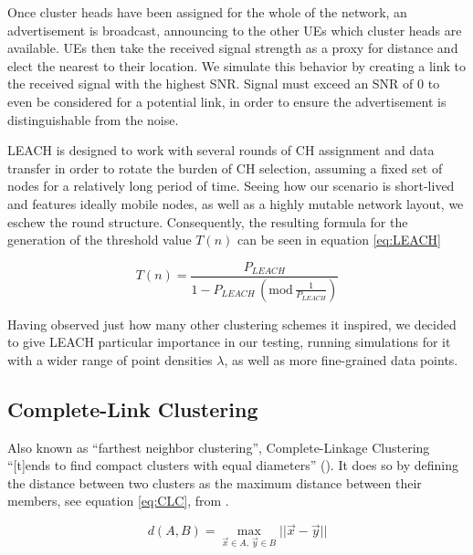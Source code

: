 Once cluster heads have been assigned for the whole of the network, an advertisement is broadcast, announcing to the other UEs which cluster heads are available. UEs then take the received signal strength as a proxy for distance and elect the nearest to their location. We simulate this behavior by creating a link to the received signal with the highest SNR. Signal must exceed an SNR of 0 to even be considered for a potential link, in order to ensure the advertisement is distinguishable from the noise. 

LEACH is designed to work with several rounds of CH assignment and data transfer in order to rotate the burden of CH selection, assuming a fixed set of nodes for a relatively long period of time. Seeing how our scenario is short-lived and features ideally mobile nodes, as well as a highly mutable network layout, we eschew the round structure. Consequently, the resulting  formula for the generation of the threshold value $T(n)$ can be seen in equation \ref{eq:LEACH}

\begin{equation}\label{eq:LEACH}
T(n) = \frac {P_{LEACH}}{1-P_{LEACH}\,(\text{mod}\,\frac {1}{P_{LEACH}})}
\end{equation}

Having observed just how many other clustering schemes it inspired, we decided to give LEACH particular importance in our testing, running simulations for it with a wider range of point densities $\lambda$, as well as more fine-grained data points.


\subsection{Complete-Link Clustering}\label{CLC}
Also known as ``farthest neighbor clustering'', Complete-Linkage Clustering ``[t]ends to find compact clusters with equal diameters'' (\cite{Everitt2011}). It does so by defining the distance between two clusters as the maximum distance between their members, see equation \ref{eq:CLC}, from \cite{Shalizi2009}. 

\begin{equation}\label{eq:CLC}
d(A,B) = \max_{\vec{x} \in A,\,\vec{y} \in B} ||\vec{x}  - \vec{y}||
\end{equation}


